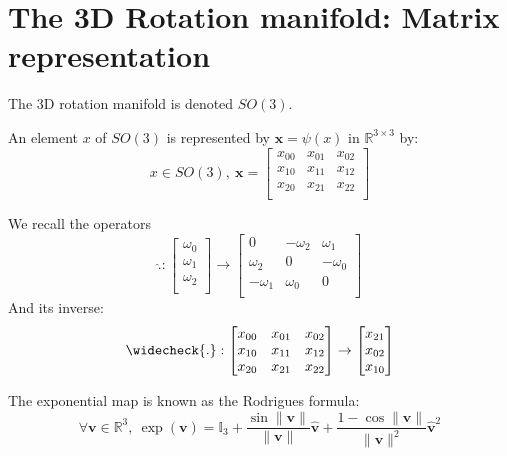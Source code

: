 \section{The 3D Rotation manifold: Matrix representation}
\label{sec:the_3d_rotation_manifold_matrix_representation}

The 3D rotation manifold is denoted $SO(3)$.

An element $x$ of $SO(3)$ is represented by $\mathbf{x}=\psi(x)$ in $\mathbb{R}^{3\times 3}$ by:
\begin{equation}
  x\in SO(3),\ \mathbf{x} =\begin{bmatrix}
    x_{00} & x_{01} & x_{02} \\
    x_{10} & x_{11} & x_{12} \\
    x_{20} & x_{21} & x_{22} \\
  \end{bmatrix}
\end{equation}

We recall the operators
\begin{equation}
\widehat{.}: \begin{bmatrix}
  \omega_0\\\omega_1\\\omega_2\\
\end{bmatrix}
\rightarrow
\begin{bmatrix}
  0 & -\omega_2 & \omega_1 \\
  \omega_2 & 0 & -\omega_0 \\
  -\omega_1 & \omega_0 & 0\\
\end{bmatrix}
\end{equation}
And its inverse:
\begin{equation}
\widecheck{.}: \begin{bmatrix}
    x_{00} & x_{01} & x_{02} \\
    x_{10} & x_{11} & x_{12} \\
    x_{20} & x_{21} & x_{22} \\
\end{bmatrix}
\rightarrow
\begin{bmatrix}
  x_{21}\\x_{02}\\x_{10}\\
\end{bmatrix}
\end{equation}


The exponential map is known as the Rodrigues formula:
\begin{equation}
  \forall \mathbf{v}\in\mathbb{R}^3,\ \exp(\mathbf{v}) = \mathbb{I}_3 +
  \frac{\sin \|\mathbf{v}\|}{\|\mathbf{v}\|} \hat{\mathbf{v}} +
  \frac{1-\cos \|\mathbf{v}\|}{\|\mathbf{v}\|^2} \hat{\mathbf{v}}^2
\end{equation}

